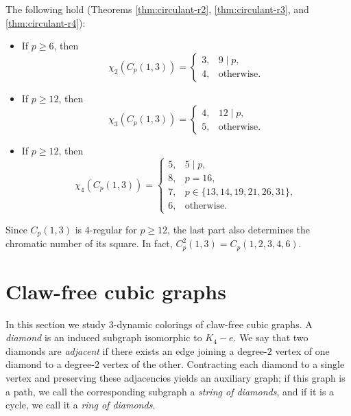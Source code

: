 \documentclass[a4paper,11pt]{article}
\theoremstyle{case}
\numberwithin{subcase}{case}
\begin{document}
The following hold (Theorems
\ref{thm:circulant-r2},     
\ref{thm:circulant-r3}, and \ref{thm:circulant-r4}):
\begin{itemize}
 \item If $p\ge6$, then
\[
\chi_2(C_p(1,3))=
\begin{cases}
3,&9\mid p,\\
4,&\text{otherwise}.
\end{cases}
\]

\item If $p\ge12$, then
\[
\chi_3(C_p(1,3))=
\begin{cases}
4,&12\mid p,\\
5,&\text{otherwise}.
\end{cases}
\]

\item If $p\ge12$, then
\[
\chi_4(C_p(1,3))=
\begin{cases}
5,&5\mid p,\\
8,&p=16,\\
7,&p\in\{13,14,19,21,26,31\},\\
6,&\text{otherwise}.
\end{cases}
\]
\end{itemize}

Since $C_p(1,3)$ is $4$-regular for $p\ge12$, the last part also
determines the chromatic number of its square. In fact,
$
C^2_p(1,3)=C_p(1,2,3,4,6).
$


\section{Claw-free cubic graphs}

In this section we study $3$-dynamic colorings of claw-free cubic graphs.
A \emph{diamond} is an induced subgraph isomorphic to $K_4 - e$. 
We say that two diamonds are \emph{adjacent} if there exists an edge joining a degree-$2$ vertex of one diamond to a degree-$2$ vertex of the other. 
Contracting each diamond to a single vertex and preserving these adjacencies yields an auxiliary graph; if this graph is a path, we call the corresponding subgraph a \emph{string of diamonds}, and if it is a cycle, we call it a \emph{ring of diamonds}.
\end{document}
